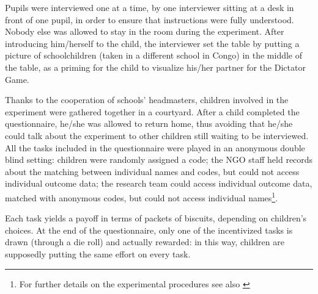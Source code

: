 \documentclass[authoryear, preprint, review, 12pt]{elsarticle}
\begin{document}
Pupils were interviewed one at a time, by one interviewer sitting at a desk in front of one pupil, in order to ensure that instructions were fully understood. Nobody else was allowed to stay in the  room during the experiment. After introducing him/herself to the child, the interviewer set the table by putting a picture of schoolchildren (taken in a different school in Congo) in the middle of the table, as a priming for the child to visualize his/her partner for the Dictator Game.   

Thanks to the cooperation of schools' headmasters, children involved in the experiment were gathered together in a courtyard. After a child  completed the questionnaire, he/she was allowed to return home, thus avoiding that he/she could talk about the experiment to other children still waiting to be interviewed.
All the tasks included in the questionnaire were played in an anonymous double blind setting: children were randomly assigned a code; the NGO staff held records about the matching between individual names and codes, but could not access individual outcome data; the research team could access individual outcome data, matched with anonymous codes, but could not access individual names\footnote{For further details on the experimental procedures see also \cite{rossignoli2017growing}}.

Each task yields a payoff in terms of packets of biscuits, depending on children's choices. At the end of the questionnaire, only one of the incentivized tasks is drawn (through a die roll) and actually rewarded: in this way, children are supposedly putting the same effort on every task.
\end{document}
